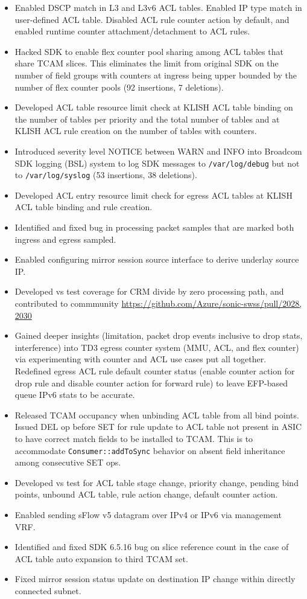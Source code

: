 \documentclass[letterpaper,11pt]{article}
\newcommand{\resitem}[1]{\item #1 \vspace{-2pt}}
\begin{document}
\begin{CJK}{UTF8}{gbsn}
\begin{itemize}
\begin{itemize}
  \resitem{Enabled DSCP match in L3 and L3v6 ACL tables. Enabled IP type match in user-defined ACL table.
  Disabled ACL rule counter action by default, and enabled runtime counter attachment/detachment to ACL rules.}
  \resitem{Hacked SDK to enable flex counter pool sharing among ACL tables that share TCAM slices. This eliminates the limit from original SDK
  on the number of field groups with counters at ingress being upper bounded by the number of flex counter pools (92 insertions, 7 deletions).}
  \resitem{Developed ACL table resource limit check at KLISH ACL table binding on the number of tables per priority and the total number of tables
  and at KLISH ACL rule creation on the number of tables with counters.}
  \resitem{Introduced severity level NOTICE between WARN and INFO into Broadcom SDK logging (BSL) system to log SDK messages
  to {\tt /var/log/debug} but not to {\tt /var/log/syslog} (53 insertions, 38 deletions).}
  \resitem{Developed ACL entry resource limit check for egress ACL tables at KLISH ACL table binding and rule creation.}
  \resitem{Identified and fixed bug in processing packet samples that are marked both ingress and egress sampled.}
  \resitem{Enabled configuring mirror session source interface to derive underlay source IP.}
  \resitem{Developed vs test coverage for CRM divide by zero processing path, and contributed to commmunity
  \url{https://github.com/Azure/sonic-swss/pull/2028, 2030}}
  \resitem{Gained deeper insights (limitation, packet drop events inclusive to drop stats, interference) into TD3 egress counter system
  (MMU, ACL, and flex counter) via experimenting with counter and ACL use cases put all together.
  Redefined egress ACL rule default counter status
  (enable counter action for drop rule and disable counter action for forward rule)
  to leave EFP-based queue IPv6 stats to be accurate.}
  \resitem{Released TCAM occupancy when unbinding ACL table from all bind points.
  Issued DEL op before SET for rule update to ACL table not present in ASIC to have correct match fields to be installed to TCAM.
  This is to accommodate {\tt Consumer::addToSync} behavior on absent field inheritance among consecutive SET ops.}
  \resitem{Developed vs test for ACL table stage change, priority change, pending bind points, unbound ACL table,
  rule action change, default counter action.}
  \resitem{Enabled sending sFlow v5 datagram over IPv4 or IPv6 via management VRF.}
  \resitem{Identified and fixed SDK 6.5.16 bug on slice reference count in the case of ACL table auto expansion to third TCAM set.}
  \resitem{Fixed mirror session status update on destination IP change within directly connected subnet.}

\end{itemize}
\end{itemize}
\end{CJK}
\end{document}
